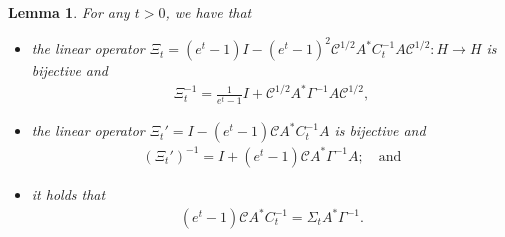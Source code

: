 \documentclass[10pt]{article} %
\theoremstyle{plain}
\newtheorem{lemma}[theorem]{Lemma}
\theoremstyle{definition}
\theoremstyle{remark}
\newcommand{\C}{\mathcal C}
\begin{document}
\begin{lemma}\label{lem: Useful equality that show that Sigma is still p.d.}
For any $t>0$, we have that
\begin{itemize}
    \item[(a)] the linear operator $\Xi_t = (e^t-1)I -(e^t-1)^2 \C^{1/2} A^*C_t^{-1}A \C^{1/2} : H \to H$ is bijective and
    \begin{eqnarray*}
    \Xi_t^{-1} = \frac{1}{e^t-1}I + \C^{1/2} A^* \Gamma^{-1}A \C^{1/2},
    \end{eqnarray*}
    \item[(b)] the linear operator $\Xi_t' = I -(e^t-1) \C A^*C_t^{-1}A$ is bijective and
    \begin{eqnarray*}
        \left(\Xi_t'\right)^{-1} = I + (e^t-1)\C A^* \Gamma^{-1}A; \quad \text{and}
    \end{eqnarray*}
    \item[(c)] it holds that
    \begin{eqnarray*}
        (e^t-1) \C A^* C_t^{-1} = \Sigma_t A^* \Gamma^{-1}.
    \end{eqnarray*}
\end{itemize}
\end{lemma}
\end{document}
